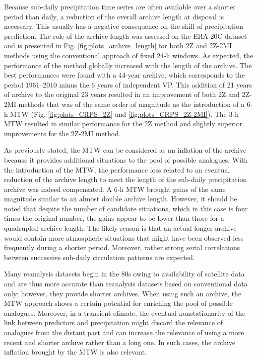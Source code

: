 \documentclass[hess, manuscript]{copernicus}
\begin{document}
	Because sub-daily precipitation time series are often available over a shorter period than daily, a reduction of the overall archive length at disposal is necessary. This usually has a negative consequence on the skill of precipitation prediction. The role of the archive length was assessed on the ERA-20C dataset and is presented in Fig. \ref{fig:plots_archive_length} for both 2Z and 2Z-2MI methods using the conventional approach of fixed 24-h windows. As expected, the performance of the method globally increased with the length of the archive. The best performances were found with a 44-year archive, which corresponds to the period 1961--2010 minus the 6 years of independent VP. This addition of 21 years of archive to the original 23 years resulted in an improvement of both 2Z and 2Z-2MI methods that was of the same order of magnitude as the introduction of a 6-h MTW (Fig. \ref{fig:plots_CRPS_2Z} and \ref{fig:plots_CRPS_2Z-2MI}). The 3-h MTW resulted in similar performance for the 2Z method and slightly superior improvements for the 2Z-2MI method.
	
	As previously stated, the MTW can be considered as an inflation of the archive because it provides additional situations to the pool of possible analogues. With the introduction of the MTW, the performance loss related to an eventual reduction of the archive length to meet the length of the sub-daily precipitation archive was indeed compensated. A 6-h MTW brought gains of the same magnitude similar to an almost double archive length. However, it should be noted that despite the number of candidate situations, which in this case is four times the original number, the gains appear to be lower than those for a quadrupled archive length. The likely reason is that an actual longer archive would contain more atmospheric situations that might have been observed less frequently during a shorter period. Moreover, rather strong serial correlations between successive sub-daily circulation patterns are expected.
	
	Many reanalysis datasets begin in the 80s owing to availability of satellite data and are thus more accurate than reanalysis datasets based on conventional data only; however, they provide shorter archives. When using such an archive, the MTW approach shows a certain potential for enriching the pool of possible analogues. Moreover, in a transient climate, the eventual nonstationarity of the link between predictors and precipitation might discard the relevance of analogues from the distant past and can increase the relevance of using a more recent and shorter archive rather than a long one. In such cases, the archive inflation brought by the MTW is also relevant.
	
\end{document}
